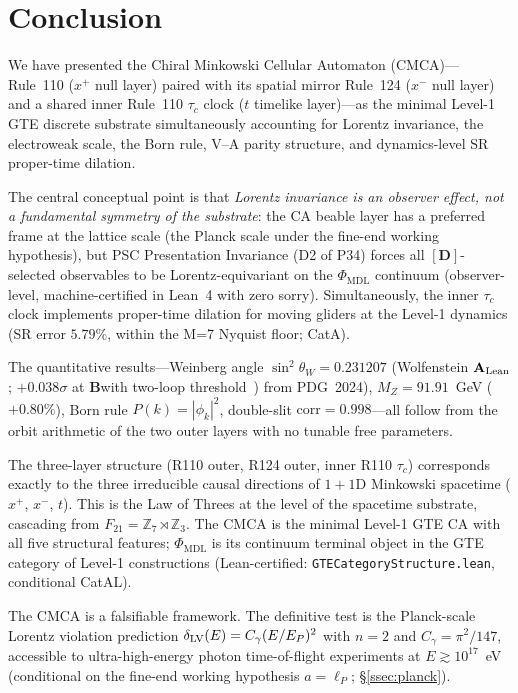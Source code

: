 \documentclass[11pt]{article}
\theoremstyle{remark}
\newcommand{\PHIMDL}{\Phi_{\mathrm{MDL}}}
\newcommand{\ZS}{\mathbb{Z}_7}
\newcommand{\lean}[1]{%
  \penalty-100
  \begingroup\def\_{\textunderscore\allowbreak}\texttt{#1}\endgroup}
\newcommand{\sinwsq}{\sin^2\!\theta_W}
\newcommand{\Mz}{M_Z}
\newcommand{\CatAL}{\ensuremath{\textbf{A}_{\rm Lean}}}
\newcommand{\CatB}{\textbf{B}}
\begin{document}
\section{Conclusion}
\label{sec:conclusion}

We have presented the Chiral Minkowski Cellular Automaton (CMCA)---Rule~110
($x^+$ null layer) paired with its spatial mirror Rule~124 ($x^-$ null layer)
and a shared inner Rule~110 $\tau_c$ clock ($t$ timelike layer)---as the
minimal Level-1 GTE discrete substrate simultaneously accounting for
Lorentz invariance, the electroweak scale, the Born rule, V--A parity
structure, and dynamics-level SR proper-time dilation.

The central conceptual point is that \emph{Lorentz invariance is an observer
effect, not a fundamental symmetry of the substrate}: the CA beable layer
has a preferred frame at the lattice scale (the Planck scale under the
fine-end working hypothesis), but PSC Presentation Invariance
(D2 of P34) forces all $[\mathbf{D}]$-selected observables to be
Lorentz-equivariant on the $\PHIMDL$ continuum (observer-level, machine-certified
in Lean~4 with zero sorry).  Simultaneously, the inner $\tau_c$ clock
implements proper-time dilation for moving gliders at the Level-1 dynamics
(SR error $5.79\%$, within the M=7 Nyquist floor; CatA).

The quantitative results---Weinberg angle $\sinwsq=0.231207$ (Wolfenstein \CatAL; $+0.038\sigma$ at \CatB with two-loop threshold~\cite{SpivackWeinbergAngle})
from PDG~2024), $\Mz=91.91$~GeV ($+0.80\%$), Born rule $P(k)=|\phi_k|^2$,
double-slit $\mathrm{corr}=0.998$---all follow from the orbit arithmetic
of the two outer layers with no tunable free parameters.

The three-layer structure (R110 outer, R124 outer, inner R110 $\tau_c$)
corresponds exactly to the three irreducible causal directions of $1+1$D
Minkowski spacetime ($x^+$, $x^-$, $t$).  This is the Law of Threes at the
level of the spacetime substrate, cascading from $F_{21}=\ZS\rtimes\mathbb{Z}_3$.
The CMCA is the minimal Level-1 GTE CA with all five structural features;
$\PHIMDL$ is its continuum terminal object in the GTE category of Level-1
constructions (Lean-certified: \lean{GTECategoryStructure.lean}, conditional CatAL).

The CMCA is a falsifiable framework.  The definitive test is the Planck-scale
Lorentz violation prediction $\delta_{\rm LV}(E)=C_\gamma(E/E_P)^2$ with
$n=2$ and $C_\gamma=\pi^2/147$, accessible to ultra-high-energy photon
time-of-flight experiments at $E\gtrsim10^{17}$~eV (conditional on the
fine-end working hypothesis $a=\ell_P$; \S\ref{ssec:planck}).
\end{document}
